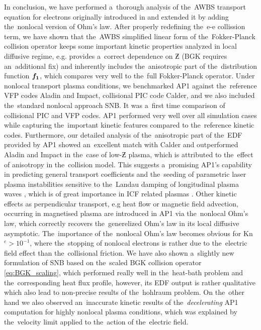 In conclusion, we have performed a~thorough analysis of the~AWBS transport 
equation for electrons originally introduced in \cite{Sorbo_2015} and extended
it by adding the~nonlocal version of Ohm's law.
After properly redefining the~e-e collission term, we have shown that the~AWBS
simplified linear form of the~Fokker-Planck collision operator keeps
some important kinetic properties analyzed in local diffusive regime, 
e.g. provides a~correct dependence 
on $\Zbar$ (BGK requires an~additional fix) and inherently includes
the~anisotropic part of the~distribution function ${\boldsymbol{f_1}}$, which compares
very well to the~full Fokker-Planck operator.
Under nonlocal transport plasma conditions, we benchmarked AP1 against 
the~reference VFP codes Aladin and Impact, collisional PIC code Calder, 
and we also included the~standard nonlocal approach SNB. It was a~first time
comparison of collisional PIC and VFP codes.
AP1 performed very well over all simulation cases while capturing 
the~important kinetic features compared to the~reference kinetic codes. 
Furthermore, our detailed analysis of the~anisotropic part of the~EDF 
provided by AP1 showed an~excellent match with Calder and outperformed
Aladin and Impact in the~case of low-$\Zbar$ plasma, which is attributed
to the~effect of anisotropy in the~collision model. 
This suggests 
a~promising AP1's capability in predicting general transport coefficients and 
the~seeding of parametric laser plasma instabilities sensitive 
to the~Landau damping of longitudinal plasma waves 
\cite{goldston1995introduction, Sorbo_2015},
which is of great importance in ICF related plasmas 
\cite{Kirkwood_NIFLPI_PPCF2013}.
Other kinetic effects as perpendicular transport, e.g heat flow
or magnetic field advection, occurring in magnetised plasma  
\cite{Walsh_Nernst_PRL2017} are introduced in
AP1 via the~nonlocal Ohm's law, which correctly recovers 
the~generelized Ohm's law in its local diffusive asymptotic.
The~importance of the~nonlocal Ohm's law becomes obvious for Kn$^e > 10^{-1}$,
where the~stopping of nonlocal electrons is rather due to the~electric field 
effect than the~collisional friction.
We have also shown a~slightly new formulation of SNB based on
the~scaled BGK collision operator \eqref{eq:BGK_scaling}, which performed
really well in the~heat-bath problem and the~corresponding heat flux profile, 
however, its EDF output is rather qualitative which also lead to 
non-precise results of the~hohlraum problem.
On the~other hand we also observed an~inaccurate kinetic results of 
the~\textit{decelerating} AP1 computation for highly nonlocal plasma 
conditions, which was explained by the~velocity limit applied to the~action
of the~electric field. 

